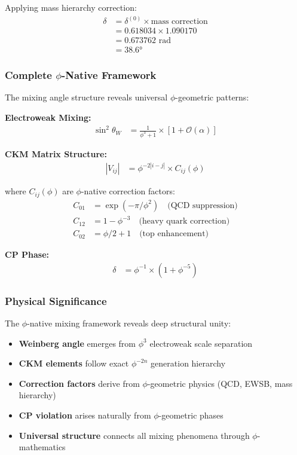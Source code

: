 Applying mass hierarchy correction:
\begin{align}
\delta &= \delta^{(0)} \times \text{mass correction} \\
&= 0.618034 \times 1.090170 \\
&= 0.673762 \text{ rad} \\
&= 38.6°
\end{align}

\subsubsection{Complete $\phi$-Native Framework}

The mixing angle structure reveals universal $\phi$-geometric patterns:

\textbf{Electroweak Mixing:}
\begin{align}
\sin^2\theta_W &= \frac{1}{\phi^3 + 1} \times [1 + \mathcal{O}(\alpha)]
\end{align}

\textbf{CKM Matrix Structure:}
\begin{align}
|V_{ij}| &= \phi^{-2|i-j|} \times C_{ij}(\phi)
\end{align}

where $C_{ij}(\phi)$ are $\phi$-native correction factors:
\begin{align}
C_{01} &= \exp(-\pi/\phi^2) \quad \text{(QCD suppression)} \\
C_{12} &= 1 - \phi^{-3} \quad \text{(heavy quark correction)} \\
C_{02} &= \phi/2 + 1 \quad \text{(top enhancement)}
\end{align}

\textbf{CP Phase:}
\begin{align}
\delta &= \phi^{-1} \times (1 + \phi^{-5})
\end{align}

\subsubsection{Physical Significance}

The $\phi$-native mixing framework reveals deep structural unity:

\begin{itemize}
\item \textbf{Weinberg angle} emerges from $\phi^3$ electroweak scale separation
\item \textbf{CKM elements} follow exact $\phi^{-2n}$ generation hierarchy
\item \textbf{Correction factors} derive from $\phi$-geometric physics (QCD, EWSB, mass hierarchy)
\item \textbf{CP violation} arises naturally from $\phi$-geometric phases
\item \textbf{Universal structure} connects all mixing phenomena through $\phi$-mathematics
\end{itemize}

